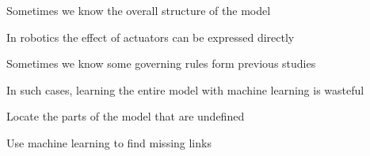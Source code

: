 \documentclass[landscape,footrule]{foils}
\begin{document}
Sometimes we know the overall structure of the model
\begin{triangles}
 \item In robotics the effect of actuators can be expressed directly
 \item Sometimes we know some governing rules form previous studies
\end{triangles} 
In such cases, learning the entire model with machine learning is wasteful
\begin{triangles}
 \item Locate the parts of the model that are undefined
 \item Use machine learning to find missing links 
\end{triangles} 
\end{document}
